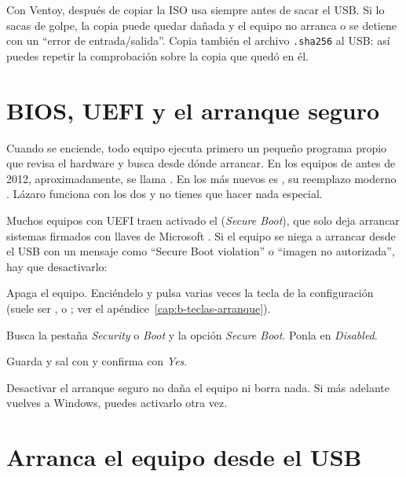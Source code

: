 \begin{cuidado}
Con Ventoy, después de copiar la ISO usa siempre  antes de sacar el USB. Si lo sacas de golpe,
la copia puede quedar dañada y el equipo no arranca o se detiene con un
\enquote{error de entrada/salida}. Copia también el archivo \texttt{.sha256} al
USB: así puedes repetir la comprobación sobre la copia que quedó en él.
\end{cuidado}

\section{BIOS, UEFI y el arranque seguro}\label{sec:bios-uefi}

Cuando se enciende, todo equipo ejecuta primero un pequeño programa propio
que revisa el hardware y busca desde dónde arrancar. En los equipos de
antes de 2012, aproximadamente, se llama . En los más nuevos
es , su reemplazo moderno \cite{uefi-org}. Lázaro funciona con
los dos y no tienes que hacer nada especial.

Muchos equipos con UEFI traen activado el 
(\emph{Secure Boot}), que solo deja arrancar sistemas firmados con llaves
de Microsoft \cite{ms-secureboot}. Si el equipo se niega a arrancar desde
el USB con un mensaje como \enquote{Secure Boot violation} o \enquote{imagen no
autorizada}, hay que desactivarlo:

\begin{pasos}
  \item Apaga el equipo. Enciéndelo y pulsa varias veces la tecla de la
        configuración (suele ser ,  o ; ver el
        apéndice~\ref{cap:b-teclas-arranque}).
  \item Busca la pestaña \emph{Security} o \emph{Boot} y la opción
        \emph{Secure Boot}. Ponla en \emph{Disabled}.
  \item Guarda y sal con  y confirma con \emph{Yes}.
\end{pasos}

\begin{nota}
Desactivar el arranque seguro no daña el equipo ni borra nada. Si más
adelante vuelves a Windows, puedes activarlo otra vez.
\end{nota}

\section{Arranca el equipo desde el USB}\label{sec:arrancar-usb}

